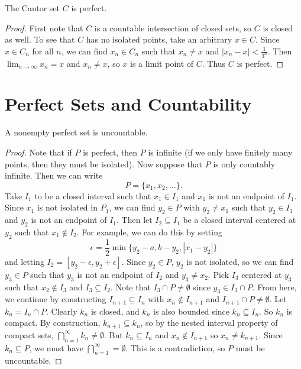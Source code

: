 \begin{theorem}
  The Cantor set $C$ is perfect.
\end{theorem}

\begin{proof}
  First note that $C$ is a countable intersection of
  closed sets, so $C$ is closed as well.
  To see that $C$ has no isolated points, take an arbitrary
  $x \in C$. Since $x \in C_n$ for all $n$, we can find
  $x_n \in C_n$ such that $x_n \ne x$ and
  $|x_n - x| < \frac{1}{3^n}$. Then $\lim_{n \to \infty} x_n = x$
  and $x_n \ne x$, so $x$ is a limit point of $C$.
  Thus $C$ is perfect.
\end{proof}

\section{Perfect Sets and Countability}

\begin{theorem}
  A nonempty perfect set is uncountable.
\end{theorem}

\begin{proof}
  Note that if $P$ is perfect, then $P$ is infinite
  (if we only have finitely many points, then they must be
  isolated). Now suppose that $P$ is only countably infinite.
  Then we can write
  \[P = \{x_1, x_2, \dots\}.\]
  Take $I_1$ to be a closed interval such that $x_1 \in I_1$
  and $x_1$ is not an endpoint of $I_1$.
  Since $x_1$ is not isolated in $P_1$, we can find $y_2 \in P$
  with $y_2 \ne x_1$
  such that $y_2 \in I_1$ and $y_2$ is not an endpoint of $I_1$.
  Then let $I_2 \subseteq I_1$ be a closed interval centered at
  $y_2$ such that $x_1 \notin I_2$. For example, we can do this
  by setting
  \[
    \epsilon = \frac{1}{2}\min\{y_2 - a, b - y_2, |x_1 - y_2|\}
  \]
  and letting $I_2 = [y_2 - \epsilon, y_2 + \epsilon]$.
  Since $y_2 \in P$, $y_2$ is not isolated, so we can find
  $y_3 \in P$ such that $y_3$ is not an endpoint of $I_2$ and
  $y_3 \ne x_2$. Pick $I_3$ centered at $y_3$ such that
  $x_2 \notin I_3$ and $I_3 \subseteq I_2$. Note that
  $I_3 \cap P \ne \emptyset$ since $y_3 \in I_3 \cap P$.
  From here, we continue by constructing
  $I_{n + 1} \subseteq I_n$ with $x_n \notin I_{n + 1}$ and
  $I_{n + 1} \cap P \ne \emptyset$. Let
  $k_n = I_n \cap P$. Clearly $k_n$ is closed, and $k_n$
  is also bounded since $k_n \subseteq I_n$. So $k_n$ is
  compact. By construction, $k_{n + 1} \subseteq k_n$, so
  by the nested interval property of compact sets,
  $\bigcap_{n = 1}^\infty k_n \ne \emptyset$. But
  $k_n \subseteq I_n$ and $x_n \notin I_{n + 1}$
  so $x_n \ne k_{n + 1}$. Since $k_n \subseteq P$, we must
  have $\bigcap_{n = 1}^\infty = \emptyset$. This is
  a contradiction, so $P$ must be uncountable.
\end{proof}
